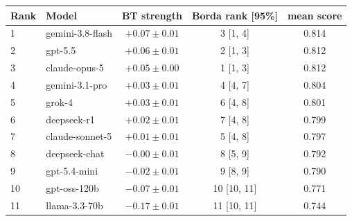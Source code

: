 \begin{tabular}{llccc}
\toprule
Rank & Model & BT strength & Borda rank [95\%] & mean score \\
\midrule
1 & gemini-3.8-flash & $+0.07 \pm 0.01$ & 3 [1, 4] & 0.814 \\
2 & gpt-5.5 & $+0.06 \pm 0.01$ & 2 [1, 3] & 0.812 \\
3 & claude-opus-5 & $+0.05 \pm 0.00$ & 1 [1, 3] & 0.812 \\
4 & gemini-3.1-pro & $+0.03 \pm 0.01$ & 4 [4, 7] & 0.804 \\
5 & grok-4 & $+0.03 \pm 0.01$ & 6 [4, 8] & 0.801 \\
6 & deepseek-r1 & $+0.02 \pm 0.01$ & 7 [4, 8] & 0.799 \\
7 & claude-sonnet-5 & $+0.01 \pm 0.01$ & 5 [4, 8] & 0.797 \\
8 & deepseek-chat & $-0.00 \pm 0.01$ & 8 [5, 9] & 0.792 \\
9 & gpt-5.4-mini & $-0.02 \pm 0.01$ & 9 [8, 9] & 0.790 \\
10 & gpt-oss-120b & $-0.07 \pm 0.01$ & 10 [10, 11] & 0.771 \\
11 & llama-3.3-70b & $-0.17 \pm 0.01$ & 11 [10, 11] & 0.744 \\
\bottomrule
\end{tabular}
